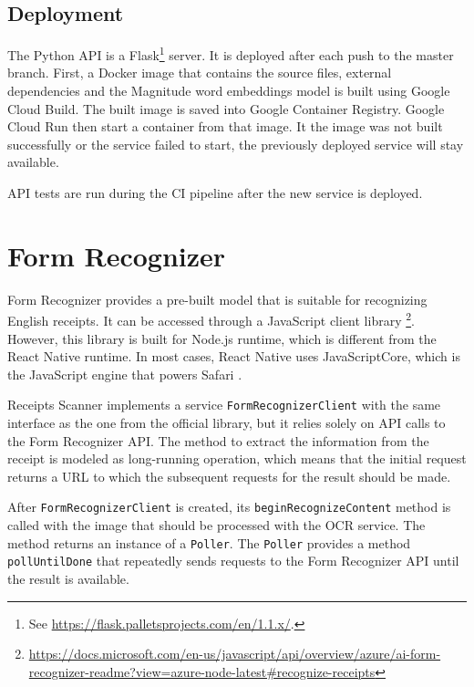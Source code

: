 \documentclass[
  digital, %
  table,   %
  oneside, %
  lof,     %
  lot,     %
]{fithesis3}
\begin{document}

\subsection{Deployment}
The Python API is a Flask\footnote{See \url{https://flask.palletsprojects.com/en/1.1.x/}.} server. 
It is deployed after each push to the master branch.
First, a Docker image that contains the source files, external dependencies and the Magnitude word embeddings model is built using Google Cloud Build. The built image is saved into Google Container Registry. Google Cloud Run then start a container from that image.
It the image was not built successfully or the service failed to start, the previously deployed service will stay available.

API tests are run during the CI pipeline after the new service is deployed.  

\section{Form Recognizer}
Form Recognizer provides a pre-built model that is suitable for recognizing English receipts. It can be accessed through a JavaScript client library \footnote{\url{https://docs.microsoft.com/en-us/javascript/api/overview/azure/ai-form-recognizer-readme?view=azure-node-latest\#recognize-receipts}}. However, this library is built for Node.js runtime, which is different from the React Native runtime. In most cases, React Native uses JavaScriptCore, which is the JavaScript engine that powers Safari \cite{JavaScriptRNEnvironment}.

Receipts Scanner implements a service \texttt{FormRecognizerClient} with the same interface as the one from the official library, but it relies solely on API calls to the Form Recognizer API. The method to extract the information from the receipt is modeled as long-running operation, which means that the initial request returns a URL to which the subsequent requests for the result should be made.

After \texttt{FormRecognizerClient} is created, its \texttt{beginRecognizeContent} method is called with the image that should be processed with the OCR service. The method returns an instance of a \texttt{Poller}. The \texttt{Poller} provides a method \texttt{pollUntilDone} that repeatedly sends requests to the Form Recognizer API until the result is available.
\end{document}
